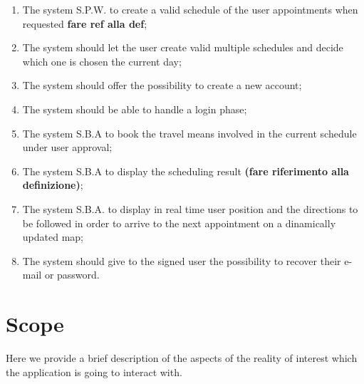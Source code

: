 \begin{enumerate}
\item The system S.P.W. to create a valid schedule of the user appointments when requested \textbf{fare ref alla def};
\label{goal:G4}

\item The system should let the user create valid multiple schedules and decide which one is chosen the current day;
\label{goal:G5}

\item The system should offer the possibility to create a new account;
\label{goal:G6}

\item The system should be able to handle a login phase;
\label{goal:G7}

\item The system S.B.A to book the travel means involved in the current schedule under user approval;
\label{goal:G8} 


\item The system S.B.A to display the scheduling result \textbf{(fare riferimento alla definizione)};
\label{goal:G9}

\item The system S.B.A. to display in real time user position and the directions to be followed in order to arrive to the next appointment on a dinamically updated map; \label{G10}

\item The system should give to the signed user the possibility to recover their e-mail or password.
\label{G11}

\end{enumerate}


\section{Scope}
Here we provide a brief description of the aspects of the reality of interest which the application is going to interact with.


